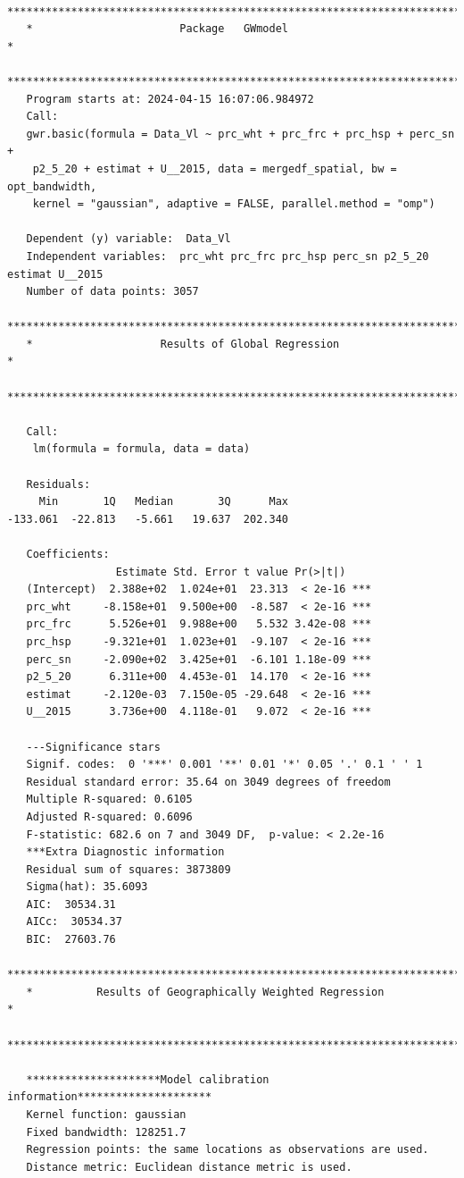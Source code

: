 \documentclass[
]{article}
\begin{document}
\begin{verbatim}
   ***********************************************************************
   *                       Package   GWmodel                             *
   ***********************************************************************
   Program starts at: 2024-04-15 16:07:06.984972 
   Call:
   gwr.basic(formula = Data_Vl ~ prc_wht + prc_frc + prc_hsp + perc_sn + 
    p2_5_20 + estimat + U__2015, data = mergedf_spatial, bw = opt_bandwidth, 
    kernel = "gaussian", adaptive = FALSE, parallel.method = "omp")

   Dependent (y) variable:  Data_Vl
   Independent variables:  prc_wht prc_frc prc_hsp perc_sn p2_5_20 estimat U__2015
   Number of data points: 3057
   ***********************************************************************
   *                    Results of Global Regression                     *
   ***********************************************************************

   Call:
    lm(formula = formula, data = data)

   Residuals:
     Min       1Q   Median       3Q      Max 
-133.061  -22.813   -5.661   19.637  202.340 

   Coefficients:
                 Estimate Std. Error t value Pr(>|t|)    
   (Intercept)  2.388e+02  1.024e+01  23.313  < 2e-16 ***
   prc_wht     -8.158e+01  9.500e+00  -8.587  < 2e-16 ***
   prc_frc      5.526e+01  9.988e+00   5.532 3.42e-08 ***
   prc_hsp     -9.321e+01  1.023e+01  -9.107  < 2e-16 ***
   perc_sn     -2.090e+02  3.425e+01  -6.101 1.18e-09 ***
   p2_5_20      6.311e+00  4.453e-01  14.170  < 2e-16 ***
   estimat     -2.120e-03  7.150e-05 -29.648  < 2e-16 ***
   U__2015      3.736e+00  4.118e-01   9.072  < 2e-16 ***

   ---Significance stars
   Signif. codes:  0 '***' 0.001 '**' 0.01 '*' 0.05 '.' 0.1 ' ' 1 
   Residual standard error: 35.64 on 3049 degrees of freedom
   Multiple R-squared: 0.6105
   Adjusted R-squared: 0.6096 
   F-statistic: 682.6 on 7 and 3049 DF,  p-value: < 2.2e-16 
   ***Extra Diagnostic information
   Residual sum of squares: 3873809
   Sigma(hat): 35.6093
   AIC:  30534.31
   AICc:  30534.37
   BIC:  27603.76
   ***********************************************************************
   *          Results of Geographically Weighted Regression              *
   ***********************************************************************

   *********************Model calibration information*********************
   Kernel function: gaussian 
   Fixed bandwidth: 128251.7 
   Regression points: the same locations as observations are used.
   Distance metric: Euclidean distance metric is used.


\end{verbatim}
\end{document}
